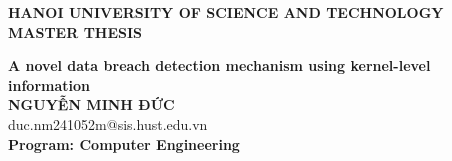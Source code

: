 \documentclass[Main.tex]{subfiles}
\begin{document}
\begin{titlepage}
  \thispagestyle{empty}
  \begin{center}

    {\textbf{\large{HANOI UNIVERSITY OF SCIENCE AND TECHNOLOGY }}}\\[4cm]

    {\textbf{\huge{MASTER THESIS}}}\\[1cm]
    {\textbf{\Large{A novel data breach detection mechanism
      using kernel-level information}}\\[1cm]

      {\textbf{\large{NGUYỄN MINH ĐỨC}}}\\
      {\large{duc.nm241052m@sis.hust.edu.vn}}\\[0.5cm]

      {\textbf{\large{Program: Computer Engineering}}}\\

      \vspace{4cm}
      \begin{table}[H]
        \centering
    \end{table}}
  \end{center}

\end{titlepage}
\end{document}
